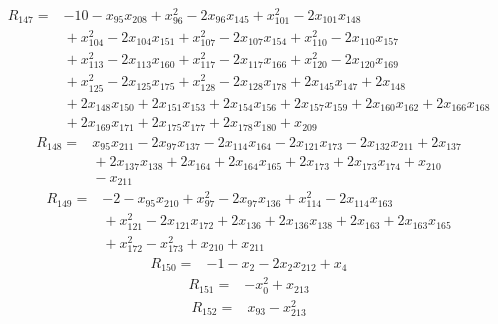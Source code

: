 {\begin{align*}
\end{align*}
\begin{align*}
R_{147} ={}& -10 - x_{95} x_{208} + x_{96}^{2} - 2x_{96} x_{145} + x_{101}^{2} - 2x_{101} x_{148} \\
&{}  + x_{104}^{2} - 2x_{104} x_{151} + x_{107}^{2} - 2x_{107} x_{154} + x_{110}^{2} - 2x_{110} x_{157} \\
&{}  + x_{113}^{2} - 2x_{113} x_{160} + x_{117}^{2} - 2x_{117} x_{166} + x_{120}^{2} - 2x_{120} x_{169} \\
&{}  + x_{125}^{2} - 2x_{125} x_{175} + x_{128}^{2} - 2x_{128} x_{178} + 2x_{145} x_{147} + 2x_{148} \\
&{}  + 2x_{148} x_{150} + 2x_{151} x_{153} + 2x_{154} x_{156} + 2x_{157} x_{159} + 2x_{160} x_{162} + 2x_{166} x_{168} \\
&{}  + 2x_{169} x_{171} + 2x_{175} x_{177} + 2x_{178} x_{180} + x_{209}
\end{align*}
\begin{align*}
R_{148} ={}& x_{95} x_{211} - 2x_{97} x_{137} - 2x_{114} x_{164} - 2x_{121} x_{173} - 2x_{132} x_{211} + 2x_{137} \\
&{}  + 2x_{137} x_{138} + 2x_{164} + 2x_{164} x_{165} + 2x_{173} + 2x_{173} x_{174} + x_{210} \\
&{}  - x_{211}
\end{align*}
\begin{align*}
R_{149} ={}& -2 - x_{95} x_{210} + x_{97}^{2} - 2x_{97} x_{136} + x_{114}^{2} - 2x_{114} x_{163} \\
&{}  + x_{121}^{2} - 2x_{121} x_{172} + 2x_{136} + 2x_{136} x_{138} + 2x_{163} + 2x_{163} x_{165} \\
&{}  + x_{172}^{2} - x_{173}^{2} + x_{210} + x_{211}
\end{align*}
\begin{align*}
R_{150} ={}& -1 - x_{2} - 2x_{2} x_{212} + x_{4}
\end{align*}
\begin{align*}
R_{151} ={}& -x_{0}^{2} + x_{213}
\end{align*}
\begin{align*}
R_{152} ={}& x_{93} - x_{213}^{2}
\end{align*}
}
